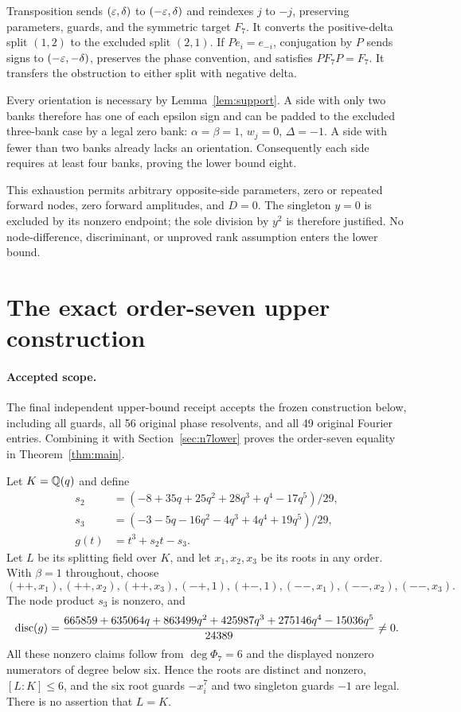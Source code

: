 \documentclass[11pt,letterpaper]{article}
\theoremstyle{definition}\newtheorem{definition}[theorem]{Definition}
\begin{document}
Transposition sends $(\varepsilon,\delta)$ to $(-\varepsilon,\delta)$ and reindexes $j$ to $-j$, preserving parameters, guards, and the symmetric target $F_7$. It converts the positive-delta split $(1,2)$ to the excluded split $(2,1)$. If $P e_i=e_{-i}$, conjugation by $P$ sends signs to $(-\varepsilon,-\delta)$, preserves the phase convention, and satisfies $PF_7P=F_7$. It transfers the obstruction to either split with negative delta.

Every orientation is necessary by Lemma~\ref{lem:support}. A side with only two banks therefore has one of each epsilon sign and can be padded to the excluded three-bank case by a legal zero bank: $\alpha=\beta=1$, $w_j=0$, $\Delta=-1$. A side with fewer than two banks already lacks an orientation. Consequently each side requires at least four banks, proving the lower bound eight.

This exhaustion permits arbitrary opposite-side parameters, zero or repeated forward nodes, zero forward amplitudes, and $D=0$. The singleton $y=0$ is excluded by its nonzero endpoint; the sole division by $y^2$ is therefore justified. No node-difference, discriminant, or unproved rank assumption enters the lower bound.

\section{The exact order-seven upper construction}\label{sec:n7upper}

\paragraph{Accepted scope.}
The final independent upper-bound receipt accepts the frozen construction below, including all guards, all 56 original phase resolvents, and all 49 original Fourier entries. Combining it with Section~\ref{sec:n7lower} proves the order-seven equality in Theorem~\ref{thm:main}.

Let $K=\mathbb Q(q)$ and define
\begin{align*}
 s_2&=(-8+35q+25q^2+28q^3+q^4-17q^5)/29,\\
 s_3&=(-3-5q-16q^2-4q^3+4q^4+19q^5)/29,\\
 g(t)&=t^3+s_2t-s_3.
\end{align*}
Let $L$ be its splitting field over $K$, and let $x_1,x_2,x_3$ be its roots in any order. With $\beta=1$ throughout, choose
\begin{equation}\label{eq:n7banks}
 (++,x_1),(++,x_2),(++,x_3),(-+,1),
 (+-,1),(--,x_1),(--,x_2),(--,x_3).
\end{equation}
The node product $s_3$ is nonzero, and
\[
 \operatorname{disc}(g)=\frac{665859+635064q+863499q^2+425987q^3+275146q^4-15036q^5}{24389}\ne0.
\]
All these nonzero claims follow from $\deg\Phi_7=6$ and the displayed nonzero numerators of degree below six. Hence the roots are distinct and nonzero, $[L:K]\leq6$, and the six root guards $-x_i^7$ and two singleton guards $-1$ are legal. There is no assertion that $L=K$.
\end{document}
